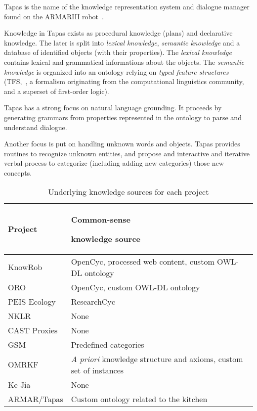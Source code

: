 {\sc Tapas} is the name of the knowledge representation system and dialogue
manager found on the ARMARIII robot~\cite{Holzapfel2008}.

Knowledge in {\sc Tapas} exists as procedural knowledge (plans) and declarative
knowledge. The later is split into \emph{lexical knowledge}, \emph{semantic
knowledge} and a database of identified objects (with their properties). The
\emph{lexical knowledge} contains lexical and grammatical informations about
the objects. The \emph{semantic knowledge} is organized into an ontology
relying on \emph{typed feature structures} (TFS,~\cite{Carpenter1992}, a
formalism originating from the computational linguistics community, and a
superset of first-order logic).

{\sc Tapas} has a strong focus on natural language grounding. It proceeds by
generating grammars from properties represented in the ontology to parse and
understand dialogue.

Another focus is put on handling unknown words and objects. {\sc Tapas}
provides routines to recognize unknown entities, and propose and interactive
and iterative verbal process to categorize (including adding new categories)
those new concepts.

\begin{table}
\begin{center}

\begin{tabular}{lp{4cm}}
\toprule
{\bf Project} & {\bf Common-sense \par knowledge source} \\
\midrule
{\sc KnowRob} & {\sc OpenCyc}, processed web content, custom OWL-DL ontology \\
ORO & {\sc OpenCyc}, custom OWL-DL ontology \\
PEIS Ecology & {\sc ResearchCyc} \\
NKLR &  None \\
CAST Proxies &  None \\
GSM &  Predefined categories \\
OMRKF & {\it A priori} knowledge structure and axioms, custom set of instances\\
Ke Jia & None \\
ARMAR/{\sc Tapas} & Custom ontology related to the kitchen\\

\bottomrule

\end{tabular}
\end{center}
\caption{Underlying knowledge sources for each project}
\label{table|knowledge-sources}
\end{table}


